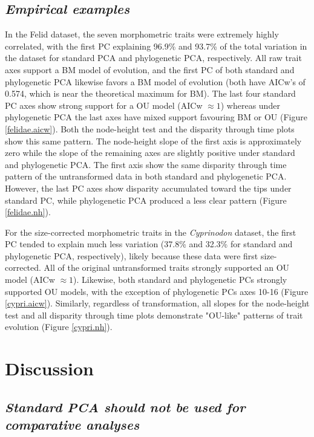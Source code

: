 \documentclass[a4paper,11pt]{article}
\begin{document}
\subsection{\emph{Empirical examples}}
In the Felid dataset, the seven morphometric traits were extremely highly correlated, with the first PC explaining 96.9\% and 93.7\% of the total variation in the dataset for standard PCA and phylogenetic PCA, respectively.
All raw trait axes support a BM model of evolution, and the first PC of both standard and phylogenetic PCA likewise favors a BM model of evolution (both have AICw's of 0.574, which is near the theoretical maximum for BM). The last four standard PC axes show strong support for a OU model (AICw $\approx 1$) whereas under phylogenetic PCA the last axes have mixed support favouring BM or OU (Figure \ref{felidae.aicw}). Both the node-height test and the disparity through time plots show this same pattern. The node-height slope of the first axis is approximately zero while the slope of the remaining axes are slightly positive under standard and phylogenetic PCA. The first axis show the same disparity through time pattern of the untransformed data in both standard and phylogenetic PCA. However, the last PC axes show disparity accumulated toward the tips under standard PC, while phylogenetic PCA produced a less clear pattern (Figure \ref{felidae.nh}).

For the size-corrected morphometric traits in the \textit{Cyprinodon} dataset, the first PC tended to explain much less variation (37.8\% and 32.3\% for standard and phylogenetic PCA, respectively), likely because these data were first size-corrected.
All of the original untransformed traits strongly supported an OU model (AICw $\approx 1$). Likewise, both standard and phylogenetic PCs strongly supported OU models, with the exception of phylogenetic PCs axes 10-16 (Figure \ref{cypri.aicw}). Similarly, regardless of transformation, all slopes for the node-height test and all disparity through time plots demonstrate "OU-like" patterns of trait evolution (Figure \ref{cypri.nh}).

\section{Discussion}
\subsection{\emph{Standard PCA should not be used for comparative analyses}} 
\end{document}
